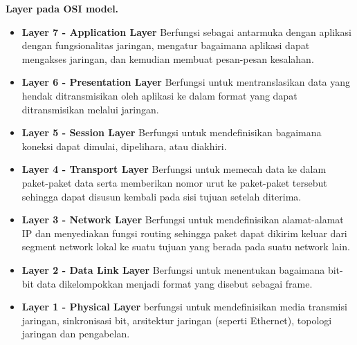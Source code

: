 \documentclass{article}
\begin{document}
\begin{flushleft}
        \textbf{Layer pada OSI model.}
        \begin{itemize}
            \item[] \textbf{Layer 7 - Application Layer}
            \newline
            Berfungsi sebagai antarmuka dengan aplikasi dengan fungsionalitas jaringan, mengatur bagaimana aplikasi dapat mengakses jaringan, dan kemudian membuat pesan-pesan kesalahan.

            \item[] \textbf{Layer 6 - Presentation Layer}
            \newline
            Berfungsi untuk mentranslasikan data yang hendak ditransmisikan oleh aplikasi ke dalam format yang dapat ditransmisikan melalui jaringan.

            \item[] \textbf{Layer 5 - Session Layer}
            \newline
            Berfungsi untuk mendefinisikan bagaimana koneksi dapat dimulai, dipelihara, atau diakhiri.

            \item[] \textbf{Layer 4 - Transport Layer}
            \newline
            Berfungsi untuk memecah data ke dalam paket-paket data serta memberikan nomor urut ke paket-paket tersebut sehingga dapat disusun kembali pada sisi tujuan setelah diterima.

            \item[] \textbf{Layer 3 - Network Layer}
            \newline
            Berfungsi untuk mendefinisikan alamat-alamat IP dan menyediakan fungsi routing sehingga paket dapat dikirim keluar dari segment network lokal ke suatu tujuan yang berada pada suatu network lain.

            \item[] \textbf{Layer 2 - Data Link Layer}
            \newline
            Berfungsi untuk menentukan bagaimana bit-bit data dikelompokkan menjadi format yang disebut sebagai frame.

            \item[] \textbf{Layer 1 - Physical Layer}
            \newline
            berfungsi untuk mendefinisikan media transmisi jaringan, sinkronisasi bit, arsitektur jaringan (seperti Ethernet), topologi jaringan dan pengabelan.
        \end{itemize}

    \end{flushleft} 
\end{document}
